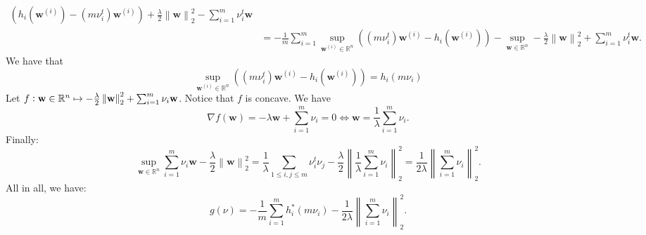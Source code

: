 \documentclass{article}
\begin{document}
\begin{itemize}
\begin{align*}
               \left(
               h_{i}\left(\mathbf{w}^{\left(i\right)}\right) - \left(m \nu_{i}^{t}\right)\mathbf{w}^{\left(i\right)}
               \right)
               + \frac{\lambda}{2} \left\|\mathbf{w}\right\|_{2}^{2}
               - \sum_{i = 1}^{m} \nu_{i}^{t} \mathbf{w} \\
               &= - \frac{1}{m} \sum_{i = 1}^{m}
               \sup_{\mathbf{w}^{\left(i\right)} \in \mathbb{R}^{n}}
               \left(\left(m \nu_{i}^{t}\right)\mathbf{w}^{\left(i\right)} 
               - h_{i}\left(\mathbf{w}^{\left(i\right)}\right)\right)
               - \sup_{\mathbf{w} \in \mathbb{R}^{n}}
               - \frac{\lambda}{2} \left\|\mathbf{w}\right\|^{2}_{2}
               + \sum_{i = 1}^{m} \nu_{i}^{t}\mathbf{w}.
           \end{align*}
           We have that
           \begin{equation*}
               \sup_{\mathbf{w}^{\left(i\right)} \in \mathbb{R}^{n}}
               \left(\left(m \nu_{i}^{t}\right) \mathbf{w}^{\left(i\right)}
               - h_{i}\left(\mathbf{w}^{\left(i\right)}\right)\right)
               = h_{i}\left(m \nu_{i}\right)
           \end{equation*}
           Let $f \vcentcolon \mathbf{w} \in \mathbb{R}^{n}
           \mapsto - \frac{\lambda}{2} \left\|\mathbf{w}\right\|^{2}_{2}
           + \sum_{i = 1}^{m} \nu_{i} \mathbf{w}$.
           Notice that $f$ is concave.
           We have
           \begin{equation*}
               \nabla f \left(\mathbf{w}\right) =
               - \lambda \mathbf{w} + \sum_{i = 1}^{m} \nu_{i} = 0
               \Longleftrightarrow
               \mathbf{w} = \frac{1}{\lambda} \sum_{i = 1}^{m} \nu_{i}.
           \end{equation*}
           Finally:
           \begin{equation*}
               \sup_{\mathbf{w} \in \mathbb{R}^{n}}
               \sum_{i = 1}^{m} \nu_{i} \mathbf{w}
               - \frac{\lambda}{2} \left\|\mathbf{w}\right\|_{2}^{2} =
               \frac{1}{\lambda}
               \sum_{1 \leq i, j \leq m}
               \nu_{i}^{t} \nu_{j}
               - \frac{\lambda}{2}
               \left\|\frac{1}{\lambda}
               \sum_{i = 1}^{m} \nu_{i}
               \right\|_{2}^{2} =
               \frac{1}{2 \lambda}
               \left\|
               \sum_{i = 1}^{m} \nu_{i}
               \right\|_{2}^{2}.
           \end{equation*}
           All in all, we have:
           \begin{equation*}
               g\left(\nu\right) = 
               - \frac{1}{m} \sum_{i = 1}^{m}
               h^{*}_{i}\left(m \nu_{i}\right)
               - \frac{1}{2 \lambda} \left\|\sum_{i = 1}^{m} \nu_{i}\right\|_{2}^{2}.
           \end{equation*}


\end{itemize}
\end{document}
